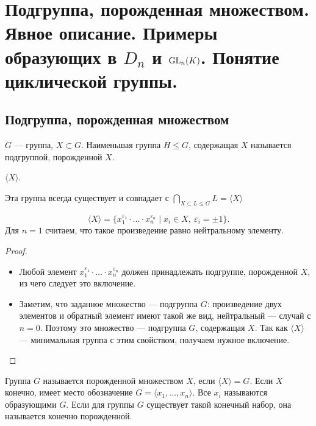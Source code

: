 % 
% 
\section{Подгруппа, порожденная множеством. Явное описание. Примеры образующих в $ D_n$ и $ {\mathop{\text{\rm GL}}}_n(K)$. Понятие циклической группы.}

\subsection{Подгруппа, порожденная множеством}
\begin{defn}
    $ G$ --- группа, $ X \subset G$. Наименьшая группа $ H \le G$, содержащая $ X$ называется  {\sf подгруппой, порожденной $ X$}.  
    \begin{name}
        $ \langle X \rangle$.
    \end{name}
    \begin{note}
	Эта группа всегда существует и совпадает с 
	$
         \bigcap_{X \subset L \le G} L = \langle X \rangle
	$
    \end{note}
\end{defn}
\begin{st}
    \[
    \langle X \rangle = \{x_1^{\varepsilon_1}\cdot \ldots \cdot x_{n}^{\varepsilon _n} \mid x_i \in  X, ~ \varepsilon _i = \pm 1\}
    .\] 
    Для $ n = 1$ считаем, что такое произведение равно нейтральному элементу.
\end{st}
\begin{proof}
    $ $
    \begin{itemize}[noitemsep]
	\item[\boxed{\supseteq}] Любой элемент $ x_1^{\varepsilon _1}\cdot \ldots \cdot x_n^{\varepsilon _n}$ должен принадлежать подгруппе, порожденной  $ X$, из чего следует это включение.
	\item[\boxed{\subseteq}] Заметим, что заданное множество --- подгруппа $ G$: произведение двух элементов и обратный элемент имеют такой же вид, нейтральный --- случай с  $ n = 0$. Поэтому это множество --- подгруппа  $ G$, содержащая  $ X$. Так как  $ \langle X \rangle$  --- минимальная группа с этим свойством, получаем нужное включение.
    \end{itemize}
\end{proof}
\begin{defn}
    Группа $ G$ называется {\sf порожденной множеством } $ X$, если   $ \langle X \rangle = G$. Если $ X$ конечно, имеет место обозначение  $ G = \langle x_1, \ldots , x_{n} \rangle$. Все $ x_i$ называются  {\sf образующими} $ G$. Если для группы  $ G$ существует такой конечный набор, она называется  {\sf конечно порожденной}.    
\end{defn}
